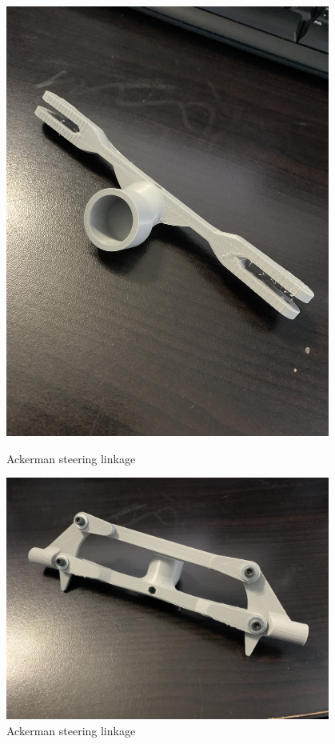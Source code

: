 \begin{figure}[ht]
\centering
\begin{minipage}[b]{.48\textwidth}
  \centering
  \includegraphics[width=0.95\textwidth]{Meetings/September/09-29-22/9-29-22_Hardware_Figure1.JPG}
  \caption{Ackerman steering linkage}
  \label{fig:pic1}
\end{minipage}%
\hfill%
\begin{minipage}[b]{.48\textwidth}
  \centering
  \includegraphics[width=0.95\textwidth]{Meetings/September/09-29-22/9-29-22_Hardware_Figure2.jpg}
  \caption{Ackerman steering linkage}
  \label{fig:pic2}
\end{minipage}
\end{figure}


